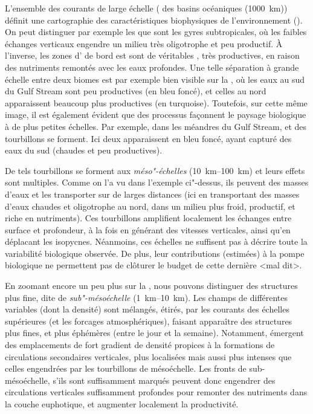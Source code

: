 L'ensemble des courants de large échelle ( des basins océaniques \OM(\qty{1000}{\km})) définit une cartographie des caractéristiques biophysiques de l'environnement (\cite{omand_2013, omand_2015a}).
On peut distinguer par exemple les  que sont les gyres subtropicales, où les faibles échanges verticaux engendre un milieu très oligotrophe et peu productif.
À l'inverse, les zones d' de bord est sont de véritables , très productives, en raison des nutriments remontés avec les eaux profondes.
Une telle séparation à grande échelle entre deux biomes est par exemple bien visible sur la , où les eaux au sud du Gulf Stream sont peu productives (en bleu foncé), et celles au nord apparaissent beaucoup plus productives (en turquoise).
Toutefois, sur cette même image, il est également évident que des processus façonnent le paysage biologique à de plus petites échelles.
Par exemple, dans les méandres du Gulf Stream, et des tourbillons se forment.
Ici deux apparaissent en bleu foncé, ayant capturé des eaux du sud (chaudes et peu productives).

De tels tourbillons se forment aux \emph{méso"-échelles} (\qtyrange{10}{100}{\km}) et leurs effets sont multiples.
Comme on l'a vu dans l'exemple ci"-dessus, ils peuvent  des masses d'eaux et les transporter sur de larges distances (ici en transportant des masses d'eaux chaudes et oligotrophe au nord,  dans un milieu plus froid, productif, et riche en nutriments).
Ces tourbillons amplifient localement les échanges entre surface et profondeur, à la fois en générant des vitesses verticales, ainsi qu'en déplacant les isopycnes.
Néanmoins, ces échelles ne suffisent pas à décrire toute la variabilité biologique observée. De plus, leur contributions (estimées) à la pompe biologique ne permettent pas de clôturer le budget de cette dernière <mal dit>.

En zoomant encore un peu plus sur la , nous pouvons distinguer des structures plus fine, dite de \emph{sub"-mésoéchelle} (\qtyrange{1}{10}{\km}).
Les champs de différentes variables (dont la densité) sont mélangés, étirés, par les courants des échelles supérieures (et les forcages atmosphériques), faisant apparaître des structures plus fines, et plus éphémères (entre le jour et la semaine).
Notamment, émergent des emplacements de fort gradient  de densité propices à la formations de circulations secondaires verticales, plus localisées mais aussi plus intenses que celles engendrées par les tourbillons de mésoéchelle.
Les fronts de sub-mésoéchelle, s'ils sont suffisamment marqués peuvent donc engendrer des circulations verticales suffisamment profondes pour remonter des nutriments dans la couche euphotique, et augmenter localement la productivité.

